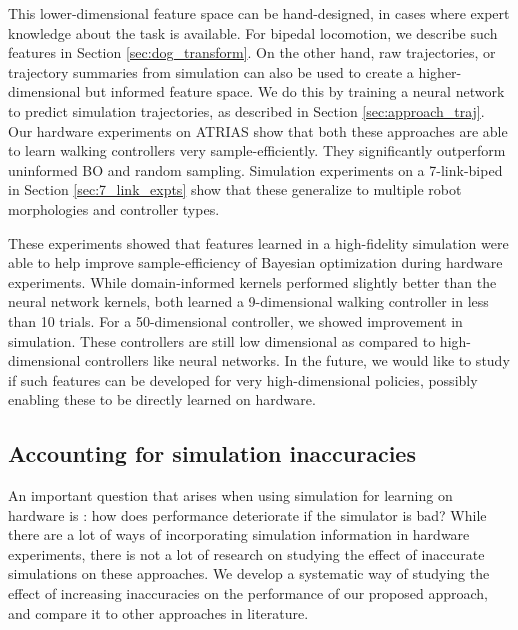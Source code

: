 This lower-dimensional feature space can be hand-designed, in cases where expert knowledge about the task is available. For bipedal locomotion, we describe such features in Section \ref{sec:dog_transform}. On the other hand, raw trajectories, or trajectory summaries from simulation can also be used to create a higher-dimensional but informed feature space. We do this by training a neural network to predict simulation trajectories, as described in Section \ref{sec:approach_traj}. Our hardware experiments on ATRIAS show that both these approaches are able to learn walking controllers very sample-efficiently. They significantly outperform uninformed BO and random sampling. Simulation experiments on a 7-link-biped in Section \ref{sec:7_link_expts} show that these generalize to multiple robot morphologies and controller types.

These experiments showed that features learned in a high-fidelity simulation were able to help improve sample-efficiency of Bayesian optimization during hardware experiments. While domain-informed kernels performed slightly better than the neural network kernels, both learned a 9-dimensional walking controller in less than 10 trials. For a 50-dimensional controller, we showed improvement in simulation. These controllers are still low dimensional as compared to high-dimensional controllers like neural networks. 
In the future, we would like to study if such features can be developed for very high-dimensional policies, possibly enabling these to be directly learned on hardware. 

\subsection{Accounting for simulation inaccuracies}

An important question that arises when using simulation for learning on hardware is : how does performance deteriorate if the simulator is bad? While there are a lot of ways of incorporating simulation information in hardware experiments, there is not a lot of research on studying the effect of inaccurate simulations on these approaches. We develop a systematic way of studying the effect of increasing inaccuracies on the performance of our proposed approach, and compare it to other approaches in literature.

